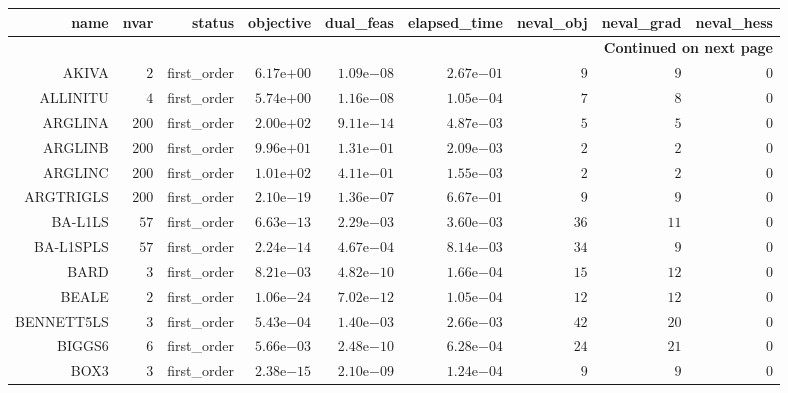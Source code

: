 \begin{longtable}{rrrrrrrrr}
\hline
name & nvar & status & objective & dual\_feas & elapsed\_time & neval\_obj & neval\_grad & neval\_hess \\\hline
\endhead
\hline
\multicolumn{9}{r}{{\bfseries Continued on next page}}\\
\hline
\endfoot
\endlastfoot
AKIVA & \(     2\) & first\_order & \( 6.17\)e\(+00\) & \( 1.09\)e\(-08\) & \( 2.67\)e\(-01\) & \(     9\) & \(     9\) & \(     0\) \\
ALLINITU & \(     4\) & first\_order & \( 5.74\)e\(+00\) & \( 1.16\)e\(-08\) & \( 1.05\)e\(-04\) & \(     7\) & \(     8\) & \(     0\) \\
ARGLINA & \(   200\) & first\_order & \( 2.00\)e\(+02\) & \( 9.11\)e\(-14\) & \( 4.87\)e\(-03\) & \(     5\) & \(     5\) & \(     0\) \\
ARGLINB & \(   200\) & first\_order & \( 9.96\)e\(+01\) & \( 1.31\)e\(-01\) & \( 2.09\)e\(-03\) & \(     2\) & \(     2\) & \(     0\) \\
ARGLINC & \(   200\) & first\_order & \( 1.01\)e\(+02\) & \( 4.11\)e\(-01\) & \( 1.55\)e\(-03\) & \(     2\) & \(     2\) & \(     0\) \\
ARGTRIGLS & \(   200\) & first\_order & \( 2.10\)e\(-19\) & \( 1.36\)e\(-07\) & \( 6.67\)e\(-01\) & \(     9\) & \(     9\) & \(     0\) \\
BA-L1LS & \(    57\) & first\_order & \( 6.63\)e\(-13\) & \( 2.29\)e\(-03\) & \( 3.60\)e\(-03\) & \(    36\) & \(    11\) & \(     0\) \\
BA-L1SPLS & \(    57\) & first\_order & \( 2.24\)e\(-14\) & \( 4.67\)e\(-04\) & \( 8.14\)e\(-03\) & \(    34\) & \(     9\) & \(     0\) \\
BARD & \(     3\) & first\_order & \( 8.21\)e\(-03\) & \( 4.82\)e\(-10\) & \( 1.66\)e\(-04\) & \(    15\) & \(    12\) & \(     0\) \\
BEALE & \(     2\) & first\_order & \( 1.06\)e\(-24\) & \( 7.02\)e\(-12\) & \( 1.05\)e\(-04\) & \(    12\) & \(    12\) & \(     0\) \\
BENNETT5LS & \(     3\) & first\_order & \( 5.43\)e\(-04\) & \( 1.40\)e\(-03\) & \( 2.66\)e\(-03\) & \(    42\) & \(    20\) & \(     0\) \\
BIGGS6 & \(     6\) & first\_order & \( 5.66\)e\(-03\) & \( 2.48\)e\(-10\) & \( 6.28\)e\(-04\) & \(    24\) & \(    21\) & \(     0\) \\
BOX3 & \(     3\) & first\_order & \( 2.38\)e\(-15\) & \( 2.10\)e\(-09\) & \( 1.24\)e\(-04\) & \(     9\) & \(     9\) & \(     0\) \\

\end{longtable}
